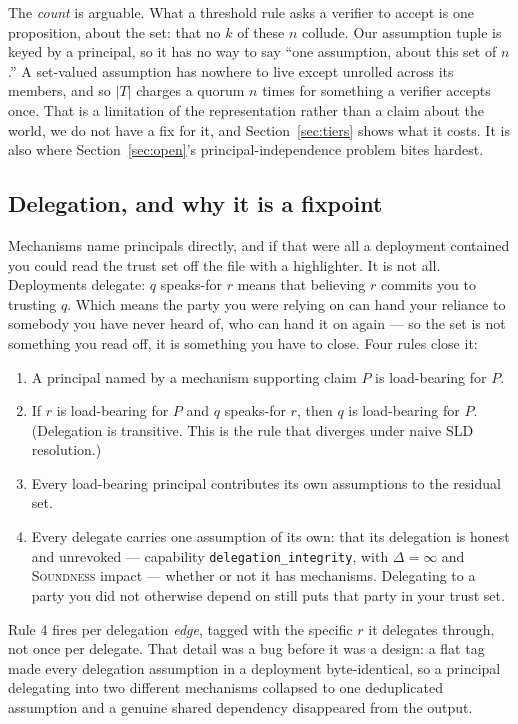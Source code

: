 \documentclass[11pt]{article}
\newcommand{\Never}{\infty}
\newcommand{\ub}{\_\allowbreak}
\begin{document}
The \emph{count} is arguable. What a threshold rule asks a verifier to
accept is one proposition, about the set: that no $k$ of these $n$ collude.
Our assumption tuple is keyed by a principal, so it has no way to say ``one
assumption, about this set of $n$.'' A set-valued assumption has nowhere to
live except unrolled across its members, and so $|T|$ charges a quorum $n$
times for something a verifier accepts once. That is a limitation of the
representation rather than a claim about the world, we do not have a fix for
it, and Section~\ref{sec:tiers} shows what it costs. It is also where
Section~\ref{sec:open}'s principal-independence problem bites hardest.

\subsection{Delegation, and why it is a fixpoint}

Mechanisms name principals directly, and if that were all a deployment
contained you could read the trust set off the file with a highlighter. It is
not all. Deployments delegate: $q$ \textsf{speaks-for} $r$ means that
believing $r$ commits you to trusting $q$. Which means the party you were
relying on can hand your reliance to somebody you have never heard of, who
can hand it on again --- so the set is not something you read off, it is
something you have to close. Four rules close it:

\begin{enumerate}[itemsep=1pt,topsep=2pt]
\item A principal named by a mechanism supporting claim $P$ is load-bearing
for $P$.
\item If $r$ is load-bearing for $P$ and $q$ \textsf{speaks-for} $r$, then $q$
is load-bearing for $P$. (Delegation is transitive. This is the rule that
diverges under naive SLD resolution.)
\item Every load-bearing principal contributes its own assumptions to the
residual set.
\item Every delegate carries one assumption of its own: that its delegation
is honest and unrevoked --- capability \texttt{delegation\ub integrity}, with
$\Delta = \Never$ and \textsc{Soundness} impact --- whether or not it has
mechanisms. Delegating to a party you did not otherwise depend on still puts
that party in your trust set.
\end{enumerate}

Rule 4 fires per delegation \emph{edge}, tagged with the specific $r$ it
delegates through, not once per delegate. That detail was a bug before it was
a design: a flat tag made every delegation assumption in a deployment
byte-identical, so a principal delegating into two different mechanisms
collapsed to one deduplicated assumption and a genuine shared dependency
disappeared from the output.
\end{document}
